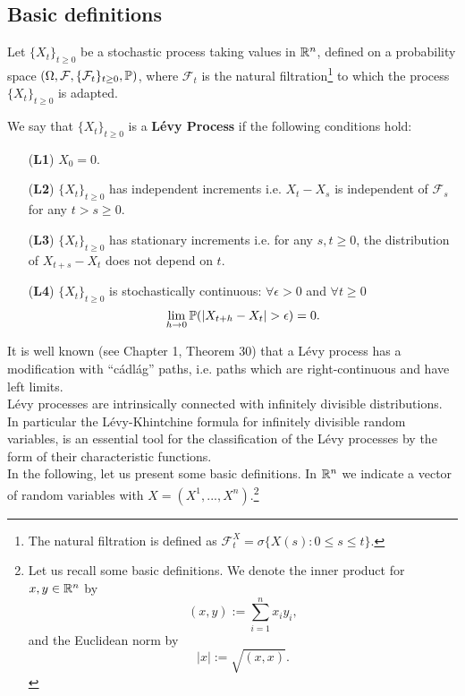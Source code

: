 \subsection{Basic definitions}

Let $\{X_t\}_{t \ge 0}$ be a stochastic process taking values in $\mathbb{R}^n$,
defined on a probability space $(\Omega,\mathcal{F},\{\mathcal{F}_t\}_{t \ge 0},\mathbb{P})$,
where $\mathcal{F}_t$ is the natural filtration\footnote{The natural filtration is defined as $\mathcal{F}_{t}^X = \sigma\{X(s) :
0\leq s \leq t\} $.} to which the process $\{X_t\}_{t \ge 0}$ is adapted.\\ 
\begin{Definition}\label{LevyDef}
We say that $\{X_t\}_{t \ge 0}$ is a \textbf{Lévy Process} if the following conditions hold:
\begin{itemize}
 \item[(\textbf{L1})] $X_{0} = 0$.
 \item[(\textbf{L2})] $\{X_t\}_{t \ge 0}$ has independent increments i.e. $X_t - X_s$ is independent of $\mathcal{F}_s$ for any $t > s \geq 0$.
 \item[(\textbf{L3})] $\{X_t\}_{t \ge 0}$ has stationary increments i.e. for any $s,t \geq 0$, the distribution of $X_{t+s} - X_t$ does not depend on $t$.  
 \item[(\textbf{L4})] $\{X_t\}_{t \ge 0}$ is stochastically continuous: $\forall \epsilon > 0 $ and $\forall t \ge 0$  $$\lim_{h\to 0} \mathbb{P}(|X_{t+h}-X_t| > \epsilon)=0. $$ 
\end{itemize}
\end{Definition}
It is well known (see \cite{Protter} Chapter 1, Theorem 30) that a Lévy process has a modification with ``cádlág''
paths, i.e. paths which are right-continuous and have left limits. \\
Lévy processes are intrinsically connected with infinitely divisible distributions. In particular the Lévy-Khintchine formula 
for infinitely divisible random variables, is an essential tool for the classification of the Lévy processes by the form of their
characteristic functions.\\
In the following, let us present some basic definitions. In $\mathbb{R}^n$ we indicate a vector of random variables with $X = (X^1, ..., X^n)$.\footnote{ 
Let us recall some basic definitions. We denote the inner product for $x,y \in \mathbb{R}^n$ by
$$(x,y) := \sum_{i=1}^n x_i y_i ,$$ and the Euclidean norm by $$|x| := \sqrt{(x,x)}.$$ }

